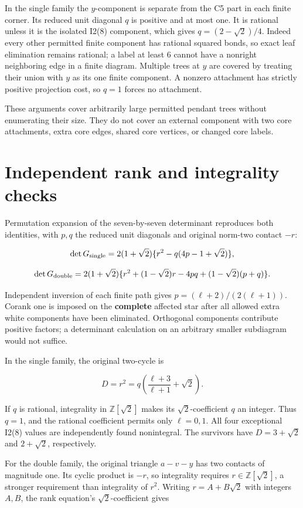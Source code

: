 \documentclass[
  10pt,
]{report}
\begin{document}
In the single family the \(y\)-component is separate from the C5 part in
each finite corner. Its reduced unit diagonal \(q\) is positive and at
most one. It is rational unless it is the isolated I2(8) component,
which gives \(q=(2-\sqrt2)/4\). Indeed every other permitted finite
component has rational squared bonds, so exact leaf elimination remains
rational; a label at least 6 cannot have a nonright neighboring edge in
a finite diagram. Multiple trees at \(y\) are covered by treating their
union with \(y\) as its one finite component. A nonzero attachment has
strictly positive projection cost, so \(q=1\) forces no attachment.

These arguments cover arbitrarily large permitted pendant trees without
enumerating their size. They do not cover an external component with two
core attachments, extra core edges, shared core vertices, or changed
core labels.

\section{Independent rank and integrality
checks}\label{independent-rank-and-integrality-checks}

Permutation expansion of the seven-by-seven determinant reproduces both
identities, with \(p,q\) the reduced unit diagonals and original
norm-two contact \(-r\):

\[
\det G_{\rm single}=2(1+\sqrt2)\{r^2-q(4p-1+\sqrt2)\},
\]

\[
\det G_{\rm double}=2(1+\sqrt2)
\{r^2+(1-\sqrt2)r-4pq+(1-\sqrt2)(p+q)\}.
\]

Independent inversion of each finite path gives
\(p=(\ell+2)/(2(\ell+1))\). Corank one is imposed on the
\textbf{complete} affected star after all allowed extra white components
have been eliminated. Orthogonal components contribute positive factors;
a determinant calculation on an arbitrary smaller subdiagram would not
suffice.

In the single family, the original two-cycle is

\[
D=r^2=q\left(\frac{\ell+3}{\ell+1}+\sqrt2\right).
\]

If \(q\) is rational, integrality in \(\mathbb Z[\sqrt2]\) makes its
\(\sqrt2\)-coefficient \(q\) an integer. Thus \(q=1\), and the rational
coefficient permits only \(\ell=0,1\). All four exceptional I2(8) values
are independently found nonintegral. The survivors have \(D=3+\sqrt2\)
and \(2+\sqrt2\), respectively.

For the double family, the original triangle \(a-v-y\) has two contacts
of magnitude one. Its cyclic product is \(-r\), so integrality requires
\(r\in\mathbb Z[\sqrt2]\), a stronger requirement than integrality of
\(r^2\). Writing \(r=A+B\sqrt2\) with integers \(A,B\), the rank
equation's \(\sqrt2\)-coefficient gives
\end{document}
